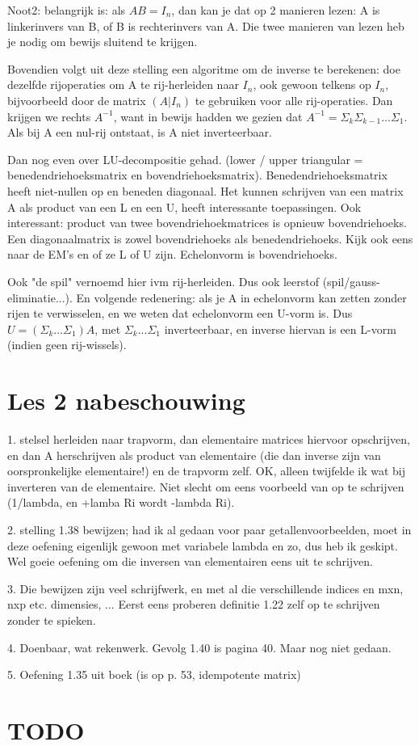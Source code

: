 \documentclass{article}
\begin{document}
Noot2: belangrijk is: als $AB=I_n$, dan kan je dat op 2 manieren lezen: A is linkerinvers van B, of B is rechterinvers van A. Die twee manieren van lezen heb je nodig om bewijs sluitend te krijgen. 

Bovendien volgt uit deze stelling een algoritme om de inverse te berekenen: doe dezelfde rijoperaties om A te rij-herleiden naar $I_n$, ook gewoon telkens op $I_n$, bijvoorbeeld door de matrix $(A|I_n)$ te gebruiken voor alle rij-operaties. Dan krijgen we rechts $A^{-1}$, want in bewijs hadden we gezien dat $A^{-1} = \Sigma_k \Sigma_{k-1} ... \Sigma_1$. Als bij A een nul-rij ontstaat, is A niet inverteerbaar. 

Dan nog even over LU-decompositie gehad. (lower / upper triangular = benedendriehoeksmatrix en bovendriehoeksmatrix). Benedendriehoeksmatrix heeft niet-nullen op en beneden diagonaal. Het kunnen schrijven van een matrix A als product van een L en een U, heeft interessante toepassingen. Ook interessant: product van twee bovendriehoekmatrices is opnieuw bovendriehoeks. Een diagonaalmatrix is zowel bovendriehoeks als benedendriehoeks. Kijk ook eens naar de EM's en of ze L of U zijn. Echelonvorm is bovendriehoeks. 

Ook "de spil" vernoemd hier ivm rij-herleiden. Dus ook leerstof (spil/gauss-eliminatie...). En volgende redenering: als je A in echelonvorm kan zetten zonder rijen te verwisselen, en we weten dat echelonvorm een U-vorm is. Dus $U= (\Sigma_k ... \Sigma_1) A$, met $\Sigma_k ... \Sigma_1$ inverteerbaar, en inverse hiervan is een L-vorm (indien geen rij-wissels). 

\section{Les 2 nabeschouwing}

1. stelsel herleiden naar trapvorm, dan elementaire matrices hiervoor opschrijven, en dan A herschrijven als product van elementaire (die dan inverse zijn van oorspronkelijke elementaire!) en de trapvorm zelf. 
OK, alleen twijfelde ik wat bij inverteren van de elementaire. Niet slecht om eens voorbeeld van op te schrijven (1/lambda, en +lamba Ri wordt -lambda Ri). 

2. stelling 1.38 bewijzen; had ik al gedaan voor paar getallenvoorbeelden, moet in deze oefening eigenlijk gewoon met variabele lambda en zo, dus heb ik geskipt. Wel goeie oefening om die inversen van elementairen eens uit te schrijven. 

3. Die bewijzen zijn veel schrijfwerk, en met al die verschillende indices en mxn, nxp etc. dimensies, ... Eerst eens proberen definitie 1.22 zelf op te schrijven zonder te spieken. 

4. Doenbaar, wat rekenwerk. Gevolg 1.40 is pagina 40. Maar nog niet gedaan. 

5. Oefening 1.35 uit boek (is op p. 53, idempotente matrix)


\section{TODO}
\end{document}
